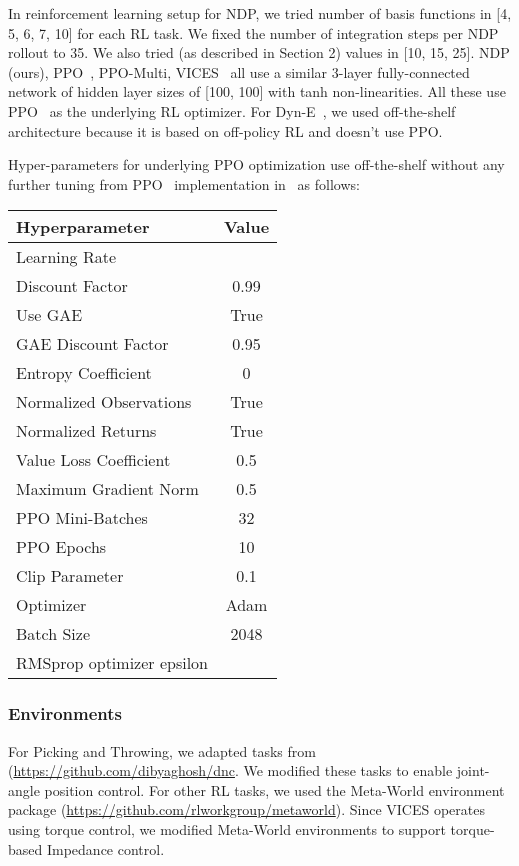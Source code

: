 \documentclass{article}
\newcommand{\our}{NDP\xspace}
\begin{document}
In reinforcement learning setup for \our, we tried number of basis functions in [4, 5, 6, 7, 10] for each RL task. We fixed the number of integration steps per \our rollout to 35. We also tried  (as described in Section 2) values in [10, 15, 25]. NDP (ours), PPO~\cite{ppo}, PPO-Multi, VICES~\cite{vices2019martin} all use a similar 3-layer fully-connected network of hidden layer sizes of [100, 100] with tanh non-linearities. All these use PPO~\cite{ppo} as the underlying RL optimizer. For Dyn-E~\cite{whitney2019dynamics}, we used off-the-shelf architecture because it is based on off-policy RL and doesn't use PPO.

Hyper-parameters for underlying PPO optimization use off-the-shelf without any further tuning from PPO~\cite{ppo} implementation in~\citet{pytorchrl} as follows:

\begin{table}[ht]
\centering
\begin{tabular}{lc}
\toprule
\textbf{Hyperparameter} & \textbf{Value}\\
\midrule
Learning Rate & \\
Discount Factor & 0.99 \\ 
Use GAE & True \\
GAE Discount Factor & 0.95 \\ 
Entropy Coefficient & 0 \\ 
Normalized Observations & True \\ 
Normalized Returns & True \\ 
Value Loss Coefficient & 0.5 \\ 
Maximum Gradient Norm & 0.5 \\ 
PPO Mini-Batches & 32 \\ 
PPO Epochs & 10 \\ 
Clip Parameter & 0.1 \\ 
Optimizer & Adam \\
Batch Size & 2048 \\
RMSprop optimizer epsilon &   \\ 
\bottomrule
\end{tabular}
\vspace{0.1cm}
\end{table}

\subsubsection*{Environments}
For Picking and Throwing, we adapted tasks from \citet{ghosh2017divide} (\url{https://github.com/dibyaghosh/dnc}. We modified these tasks to enable joint-angle position control. For other RL tasks, we used the Meta-World environment package \cite{yu2019meta} (\url{https://github.com/rlworkgroup/metaworld}). Since VICES \cite{vices2019martin} operates using torque control, we modified Meta-World environments to support torque-based Impedance control. 
\end{document}
